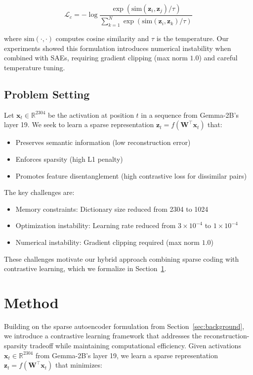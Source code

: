 \documentclass{article} %
\begin{document}
\begin{equation}
    \mathcal{L}_c = -\log\frac{\exp(\text{sim}(\mathbf{z}_i,\mathbf{z}_j)/\tau)}{\sum_{k=1}^N \exp(\text{sim}(\mathbf{z}_i,\mathbf{z}_k)/\tau)}
\end{equation}

where $\text{sim}(\cdot,\cdot)$ computes cosine similarity and $\tau$ is the temperature. Our experiments showed this formulation introduces numerical instability when combined with SAEs, requiring gradient clipping (max norm $1.0$) and careful temperature tuning.

\subsection{Problem Setting}
Let $\mathbf{x}_t \in \mathbb{R}^{2304}$ be the activation at position $t$ in a sequence from Gemma-2B's layer 19. We seek to learn a sparse representation $\mathbf{z}_t = f(\mathbf{W}^\top\mathbf{x}_t)$ that:

\begin{itemize}
    \item Preserves semantic information (low reconstruction error)
    \item Enforces sparsity (high L1 penalty)
    \item Promotes feature disentanglement (high contrastive loss for dissimilar pairs)
\end{itemize}

The key challenges are:
\begin{itemize}
    \item Memory constraints: Dictionary size reduced from 2304 to 1024
    \item Optimization instability: Learning rate reduced from $3\times10^{-4}$ to $1\times10^{-4}$
    \item Numerical instability: Gradient clipping required (max norm $1.0$)
\end{itemize}

These challenges motivate our hybrid approach combining sparse coding with contrastive learning, which we formalize in Section~\ref{sec:method}.

\section{Method}
\label{sec:method}

Building on the sparse autoencoder formulation from Section~\ref{sec:background}, we introduce a contrastive learning framework that addresses the reconstruction-sparsity tradeoff while maintaining computational efficiency. Given activations $\mathbf{x}_t \in \mathbb{R}^{2304}$ from Gemma-2B's layer 19, we learn a sparse representation $\mathbf{z}_t = f(\mathbf{W}^\top\mathbf{x}_t)$ that minimizes:
\end{document}
